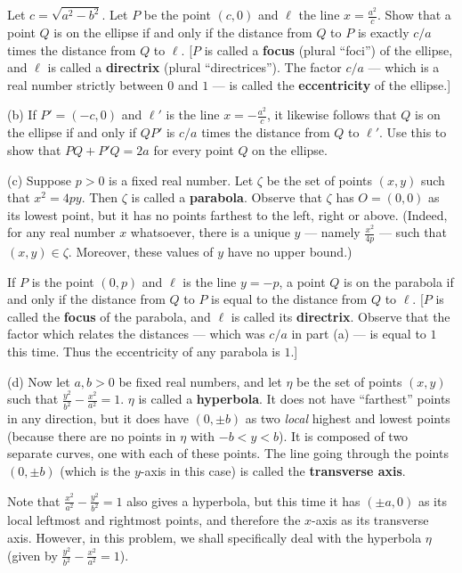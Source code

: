 \documentclass[leqno]{book}
\begin{document}
\begin{enumerate}
Let $c=\sqrt{a^2-b^2}$.  Let $P$ be the point $(c,0)$ and $\ell$ the line $x=\frac{a^2}c$.  Show that a point $Q$ is on the ellipse if and only if the distance from $Q$ to $P$ is exactly $c/a$ times the distance from $Q$ to $\ell$.  [$P$ is called a \textbf{focus} (plural ``foci'') of the ellipse, and $\ell$ is called a \textbf{directrix} (plural ``directrices'').  The factor $c/a$ \---- which is a real number strictly between $0$ and $1$ \---- is called the \textbf{eccentricity} of the ellipse.]

(b) If $P'=(-c,0)$ and $\ell'$ is the line $x=-\frac{a^2}c$, it likewise follows that $Q$ is on the ellipse if and only if $QP'$ is $c/a$ times the distance from $Q$ to $\ell'$.  Use this to show that $PQ+P'Q=2a$ for every point $Q$ on the ellipse.

(c) Suppose $p>0$ is a fixed real number.  Let $\zeta$ be the set of points $(x,y)$ such that $x^2=4py$.  Then $\zeta$ is called a \textbf{parabola}.  Observe that $\zeta$ has $O=(0,0)$ as its lowest point, but it has no points farthest to the left, right or above.  (Indeed, for any real number $x$ whatsoever, there is a unique $y$ \---- namely $\frac{x^2}{4p}$ \---- such that $(x,y)\in\zeta$.  Moreover, these values of $y$ have no upper bound.)

If $P$ is the point $(0,p)$ and $\ell$ is the line $y=-p$, a point $Q$ is on the parabola if and only if the distance from $Q$ to $P$ is equal to the distance from $Q$ to $\ell$.  [$P$ is called the \textbf{focus} of the parabola, and $\ell$ is called its \textbf{directrix}.  Observe that the factor which relates the distances \---- which was $c/a$ in part (a) \---- is equal to $1$ this time.  Thus the eccentricity of any parabola is $1$.]

(d) Now let $a,b>0$ be fixed real numbers, and let $\eta$ be the set of points $(x,y)$ such that $\frac{y^2}{b^2}-\frac{x^2}{a^2}=1$.  $\eta$ is called a \textbf{hyperbola}.  It does not have ``farthest'' points in any direction, but it does have $(0,\pm b)$ as two \emph{local} highest and lowest points (because there are no points in $\eta$ with $-b<y<b$).  It is composed of two separate curves, one with each of these points.  The line going through the points $(0,\pm b)$ (which is the $y$-axis in this case) is called the \textbf{transverse axis}.

Note that $\frac{x^2}{a^2}-\frac{y^2}{b^2}=1$ also gives a hyperbola, but this time it has $(\pm a,0)$ as its local leftmost and rightmost points, and therefore the $x$-axis as its transverse axis.  However, in this problem, we shall specifically deal with the hyperbola $\eta$ (given by $\frac{y^2}{b^2}-\frac{x^2}{a^2}=1$).


\end{enumerate}
\end{document}
